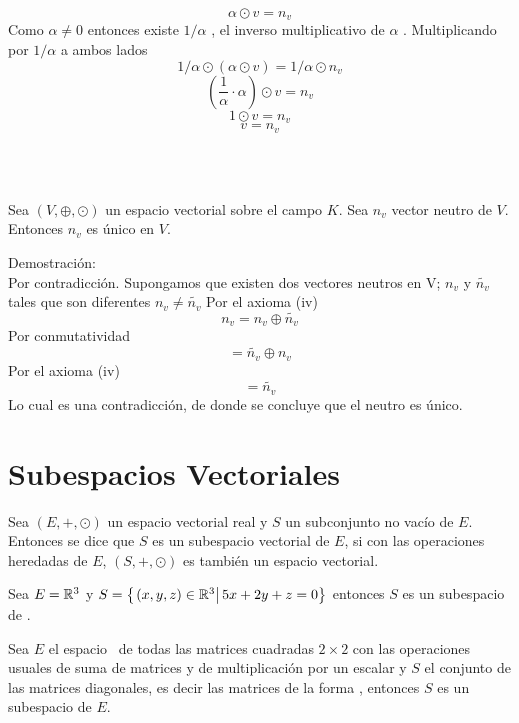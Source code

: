 $$\alpha \odot v=n_v$$
Como $ \alpha \neq 0$ entonces existe $1/\alpha$ , el inverso multiplicativo de $\alpha$ . Multiplicando por $1/\alpha $ a ambos lados 
$$1/\alpha \odot (\alpha \odot v)=1/\alpha \odot n_v$$
     $$\left(\frac{1}{\alpha} \cdot \alpha \right)\odot v=n_v$$
    $$ 1\odot v=n_v$$
     $$   v=n_v  $$

~\\
~\\


\begin{theorem}
Sea $(V,\oplus ,\odot )$ un espacio vectorial sobre el campo $K$. Sea $ n_v$ vector neutro de $V$. Entonces $n_v$ es único en $V$.
\end{theorem}
Demostración:
~\\

Por contradicción. Supongamos que existen dos vectores neutros en V; $n_v$ y $\widetilde{n_v}$ tales que son diferentes $n_v\neq \widetilde{n_v}$
Por el axioma (iv)
$$n_v=n_v\oplus \widetilde{n_v} $$
Por conmutatividad
$$=\widetilde{n_v} \oplus n_v  $$
Por el axioma (iv)
$$=\widetilde{n_v} $$
Lo cual es una contradicción, de donde se concluye que el neutro es único.



\newpage



\section{Subespacios Vectoriales}
\begin{dfn}
Sea $(E, +, \odot)$ un espacio vectorial real y $S$ un subconjunto no vacío de $E$. Entonces se dice que $S$ es un subespacio vectorial de $E$, si con las operaciones heredadas de $E$, $(S, +, \odot)$ es también un espacio vectorial.
\end{dfn}


\begin{ejemplo}
Sea $E = \mathbb{R}^3$ y $S = \left\{ \left. (x, y, z) \in \mathbb{R}^3\right| 5x + 2y + z = 0 \right\}$ entonces $S$ es un subespacio de \rtres.
\end{ejemplo}

\begin{ejemplo}
Sea $E$ el espacio \mdosxdos \ de todas las matrices cuadradas $2 \times 2$ con las operaciones usuales de suma de matrices y de multiplicación por un escalar y $S$ el conjunto de las matrices diagonales, es decir las matrices de la forma , entonces $S$ es un subespacio de $E$.

\end{ejemplo}

